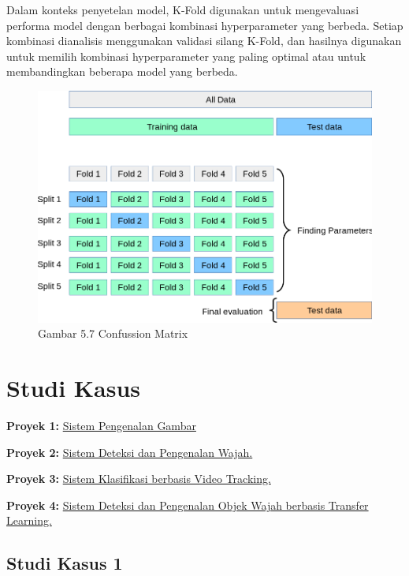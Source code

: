 \documentclass[
  letterpaper,
  DIV=11,
  numbers=noendperiod]{scrreprt}
\begin{document}
Dalam konteks penyetelan model, K-Fold digunakan untuk mengevaluasi
performa model dengan berbagai kombinasi hyperparameter yang berbeda.
Setiap kombinasi dianalisis menggunakan validasi silang K-Fold, dan
hasilnya digunakan untuk memilih kombinasi hyperparameter yang paling
optimal atau untuk membandingkan beberapa model yang berbeda.

\begin{figure}

{\centering \includegraphics{Asset/kfold.png}

}

\caption{Gambar 5.7 Confussion Matrix}

\end{figure}

\part{ Studi Kasus }

\textbf{Proyek 1:} \protect\hyperlink{studi-kasus-1}{Sistem Pengenalan
Gambar}

\textbf{Proyek 2:} \protect\hyperlink{studi-kasus-2}{Sistem Deteksi dan
Pengenalan Wajah.}

\textbf{Proyek 3:} \protect\hyperlink{studi-kasus-3}{Sistem Klasifikasi
berbasis Video Tracking.}

\textbf{Proyek 4:} \protect\hyperlink{studi-kasus-4}{Sistem Deteksi dan
Pengenalan Objek Wajah berbasis Transfer Learning.}

\hypertarget{studi-kasus-1}{%
\chapter*{Studi Kasus 1}\label{studi-kasus-1}}
\end{document}

